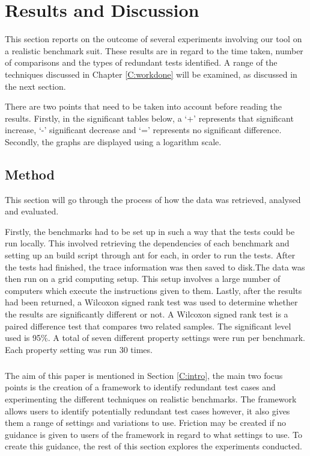 \chapter{Results and Discussion}\label{C:results}\label{C:evaluation}

This section reports on the outcome of several experiments involving our tool on a realistic benchmark suit. These results are in regard to the time taken, number of comparisons and the types of redundant tests identified. A range of the techniques discussed in Chapter \ref{C:workdone} will be examined, as discussed in the next section. 

There are two points that need to be taken into account before reading the results. Firstly, in the significant tables below, a `+' represents that significant increase, `-' significant decrease and `=' represents no significant difference. Secondly, the graphs are displayed using a logarithm scale.
\section{Method}

This section will go through the process of how the data was retrieved, analysed and evaluated.

Firstly, the benchmarks had to be set up in such a way that the tests could be run locally. This involved retrieving the dependencies of each benchmark and setting up an build script through ant for each, in order to run the tests. After the tests had finished, the trace information was then saved to disk.The data was then run on a grid computing setup. This setup involves a large number of computers which execute the instructions given to them. Lastly, after the results had been returned, a Wilcoxon signed rank test was used to determine whether the results are significantly different or not. A Wilcoxon signed rank test is a paired difference test that compares two related samples. The significant level used is 95\%. A total of seven different property settings were run per benchmark. Each property setting was run 30 times. 
\paragraph{}
The aim of this paper is mentioned in Section \ref{C:intro}, the main two focus points is the creation of a framework to identify redundant test cases and experimenting the different techniques on realistic benchmarks. The framework allows users to identify potentially redundant test cases however, it also gives them a range of settings and variations to use. Friction may be created if no guidance is given to users of the framework in regard to what settings to use. To create this guidance, the rest of this section explores the experiments conducted.


